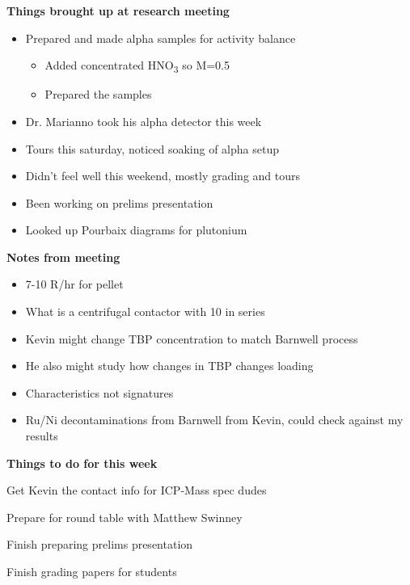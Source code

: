 \documentclass[idxtotoc,hyperref,openany,oneside]{labbook} %
\newcommand{\cmark}{\ding{51}}%
\newcommand{\done}{\rlap{$\square$}{\raisebox{2pt}{\large\hspace{1pt}\cmark}}%
  \hspace{-2.5pt}}
\newcommand{\tsbs}{\textsubscript}
\begin{document}
\textbf{Things brought up at research meeting}
\begin{itemize}
\item{Prepared and made alpha samples for activity balance}
  \begin{itemize}
  \item{Added concentrated HNO\tsbs{3} so M=0.5}
  \item{Prepared the samples}
  \end{itemize}
\item{Dr. Marianno took his alpha detector this week}
\item{Tours this saturday, noticed soaking of alpha setup}
\item{Didn't feel well this weekend, mostly grading and tours}
\item{Been working on prelims presentation}
\item{Looked up Pourbaix diagrams for plutonium}
\end{itemize}

\textbf{Notes from meeting}
\begin{itemize}
\item{7-10 R/hr for pellet}
\item{What is a centrifugal contactor with 10 in series}
\item{Kevin might change TBP concentration to match Barnwell process}
\item{He also might study how changes in TBP changes loading}
\item{Characteristics not signatures}
\item{Ru/Ni decontaminations from Barnwell from Kevin, could check against my results}
\end{itemize}
  
\textbf{Things to do for this week}
\begin{todolist}
\item[\done]{Get Kevin the contact info for ICP-Mass spec dudes}
\item{Prepare for round table with Matthew Swinney}
\item{Finish preparing prelims presentation}
\item{Finish grading papers for students}
\end{todolist}


\end{document}
